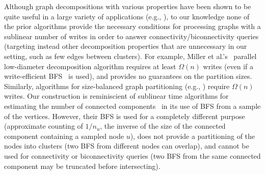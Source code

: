 Although graph decompositions with various properties have been shown
to be quite useful in a large variety of applications (e.g.,
\cite{abraham2012using, awerbuch1985complexity, awerbuch1992low, awerbuch1989network, blelloch2014nearly, linial1991decomposing, miller2013parallel}),
to our knowledge none of the prior
algorithms provide the necessary conditions for processing graphs
with a sublinear number of writes in order to answer connectivity/biconnectivity
queries (targeting instead other decomposition properties
that are unnecessary in our setting, such as few edges between
clusters).  For example, Miller et al.'s~\cite{miller2013parallel}
parallel low-diameter decomposition algorithm requires at least
$\Omega(n)$ writes (even if a write-efficient BFS~\cite{BBFGGMS16} is
used), and provides no guarantees on the partition sizes.  Similarly,
algorithms for size-balanced graph partitioning (e.g.,
\cite{andreev2004balanced}) require $\Omega(n)$ writes.  Our
\implicit{} construction is reminiscient of sublinear time algorithms
for estimating the number of connected
components~\cite{Berenbrink2014ipl, chazelle2005siam} in its use of
BFS from a sample of the vertices.  However, their BFS is used for a
completely different purpose (approximate counting of $1/n_u$, the
inverse of the size of the connected component containing a sampled
node $u$), does not provide a partitioning of the nodes into clusters
(two BFS from different nodes can overlap), and cannot be used for
connectivity or biconnectivity queries (two BFS from the same
connected component may be truncated before intersecting).


